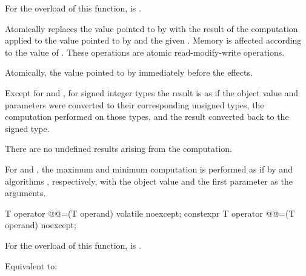 \begin{itemdescr}
\pnum
\constraints
For the  overload of this function,
 is .

\pnum
\effects
Atomically replaces the value pointed to by
 with the result of the computation applied to the
value pointed to by  and the given .
Memory is affected according to the value of .
These operations are atomic read-modify-write operations.

\pnum
\returns
Atomically, the value pointed to by  immediately before the effects.

\pnum
{}%
\remarks
Except for  and , for signed integer types
the result is as if the object value and parameters
were converted to their corresponding unsigned types,
the computation performed on those types, and
the result converted back to the signed type.
\begin{note}
There are no undefined results arising from the computation.
\end{note}

\pnum
For  and , the maximum and minimum
computation is performed as if by  and  algorithms
, respectively, with the object value and the first parameter
as the arguments.
\end{itemdescr}

%
%
%
%
%
%
%
\begin{itemdecl}
T operator @@=(T operand) volatile noexcept;
constexpr T operator @@=(T operand) noexcept;
\end{itemdecl}

\begin{itemdescr}
\pnum
\constraints
For the  overload of this function,
 is .

\pnum
\effects
Equivalent to: 
\end{itemdescr}

